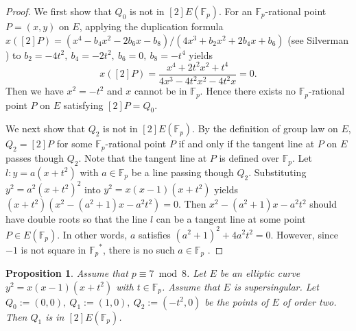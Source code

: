 \documentclass[a4paper, 11pt]{article}
\theoremstyle{plain}
\newtheorem{prop}[defn]{Proposition}
\newcommand{\?}{\textcolor{red}{??}}
\newcommand{\fp}{\mathbb{F}_p}
\begin{document}
\begin{proof}

    We first show that $Q_0$ is not in $[2]E(\fp)$. For an $\fp$-rational point $P=(x,y)$ on $E$, applying the duplication formula  $x([2]P)=(x^4-b_4x^2-2b_6x-b_8)/(4x^3+b_2x^2+2b_4x+b_6)$ (see Silverman \cite[Group Law Algorithm 2.3 (d)]{AEC}) to $b_2=-4t^2,\ b_4=-2t^2,\ b_6=0,\ b_8=-t^4$ yields
        \[
        x([2]P)= \frac{x^4+2t^2x^2+t^4}{4x^3-4t^2x^2-4t^2x}=0 .
        \]
    Then we have $x^2=-t^2$ and $x$ cannot be in $\fp$. Hence there exists no $\fp$-rational point $P$ on $E$ satisfying $[2]P=Q_0$.

    We next show that $Q_2$ is not in $[2]E(\fp)$. By the definition of group law on $E$, $Q_2=[2]P$ for some $\fp$-rational point $P$ if and only if the tangent line at $P$ on $E$ passes though $Q_2$. Note that the tangent line at $P$ is defined over $\fp$.  Let $l:y=a(x+t^2)$ with $a \in \fp$ be a line passing though $Q_2$. Substituting $y^2=a^2(x+t^2)^2$ into $y^2=x(x-1)(x+t^2)$ yields $(x+t^2)(x^2-(a^2+1)x-a^2t^2)=0$. Then $x^2-(a^2+1)x-a^2t^2$ should have double roots so that the line $l$ can be a tangent line at some point $P \in E(\fp)$. In other words, $a$ satisfies 
        $(a^2+1)^2+4a^2t^2=0$. However, since $-1$ is not square in ${\fp}^{*}$, there is no such $a\in \fp$ .    
\end{proof}

\begin{prop}
\label{p7in2}
    Assume that $p \equiv 7 \bmod 8$. Let $E$ be an elliptic curve $y^2=x(x-1)(x+t^2)$ with $t \in \fp$. Assume that $E$ is supersingular. Let $Q_0:=(0,0),\ Q_1:=(1,0),\ Q_2:=(-t^2,0)$ be the points of $E$ of order two. Then $Q_1$ is in $[2]E(\fp)$.
\end{prop}
\end{document}
